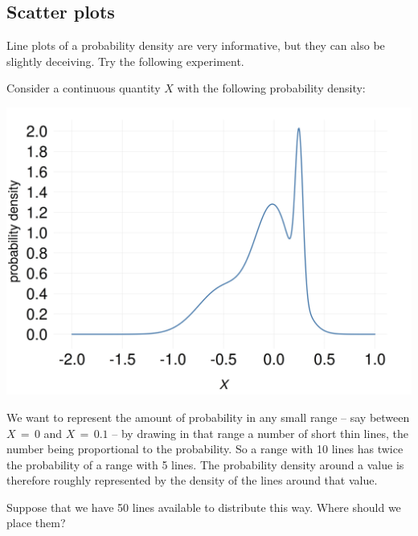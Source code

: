 \documentclass[
  a4paper,
  DIV=11,
  numbers=noendperiod,
  oneside]{scrreprt}
\begin{document}
\hypertarget{scatter-plots}{%
\subsection{Scatter plots}\label{scatter-plots}}

Line plots of a probability density are very informative, but they can
also be slightly deceiving. Try the following experiment.

Consider a continuous quantity \(X\) with the following probability
density:

\includegraphics[width=1\textwidth,height=\textheight]{example_curve_density.png}

We want to represent the amount of probability in any small range -- say
between \(X\mathord{\,=\,}0\) and \(X\mathord{\,=\,}0.1\) -- by drawing
in that range a number of short thin lines, the number being
proportional to the probability. So a range with 10 lines has twice the
probability of a range with 5 lines. The probability density around a
value is therefore roughly represented by the density of the lines
around that value.

Suppose that we have 50 lines available to distribute this way. Where
should we place them?
\end{document}
